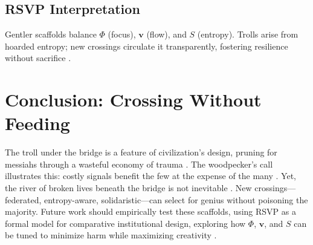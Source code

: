 \documentclass[12pt]{article}
\begin{document}
\subsection{RSVP Interpretation}
Gentler scaffolds balance $\Phi$ (focus), $\mathbf{v}$ (flow), and $S$ (entropy). Trolls arise from hoarded entropy; new crossings circulate it transparently, fostering resilience without sacrifice \citep{doctorow2023internet}.

\section{Conclusion: Crossing Without Feeding}
The troll under the bridge is a feature of civilization’s design, pruning for messiahs through a wasteful economy of trauma \citep{zahavi1997handicap}. The woodpecker’s call illustrates this: costly signals benefit the few at the expense of the many \citep{gould1977ontogeny}. Yet, the river of broken lives beneath the bridge is not inevitable \citep{weil1958oppression}. New crossings—federated, entropy-aware, solidaristic—can select for genius without poisoning the majority. Future work should empirically test these scaffolds, using RSVP as a formal model for comparative institutional design, exploring how $\Phi$, $\mathbf{v}$, and $S$ can be tuned to minimize harm while maximizing creativity \citep{graeber2021dawn, strugatsky2016doomed}.


\end{document}
